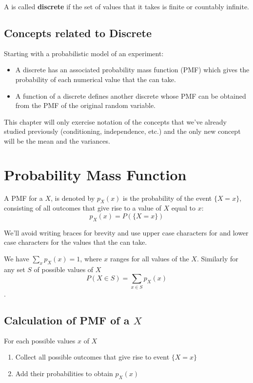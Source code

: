 \begin{definition}
    A \rv is called \textbf{discrete} if the set of values that it takes is finite or countably infinite.
\end{definition}

\subsection{Concepts related to Discrete \RV}
Starting with a probabilistic model of an experiment:
\begin{itemize}
    \item A discrete \rv has an associated probability mass function (PMF) which gives the probability of each numerical value that the \rv can take.
    \item A function of a discrete \rv defines another discrete \rv whose PMF can be obtained from the PMF of the original random variable.
\end{itemize}

This chapter will only exercise notation of the concepts that we've already studied previously (conditioning, independence, etc.) and the only new concept will be the mean and the variances.

\section {Probability Mass Function}
A PMF for a \rv $X$, is denoted by $p_X(x)$ is the probability of the event $\{X=x\}$, consisting of all outcomes that give rise to a value of $X$ equal to $x$:
\[p_X(x)=P(\{X=x\})\]

We'll avoid writing braces for brevity and use upper case characters for \RV and lower case characters for the values that the \rv can take.

We have $\sum_x p_X(x)=1$, where $x$ ranges for all values of the \rv $X$. Similarly for any set $S$ of possible values of $X$ 
\[P(X \in S) = \sum_{x\in S} p_X(x)\].

\subsection{Calculation of PMF of a \RV $X$}
For each possible values $x$ of $X$
\begin{enumerate}
    \item Collect all possible outcomes that give rise to event $\{X=x\}$
    \item Add their probabilities to obtain $p_X(x)$
\end{enumerate}

